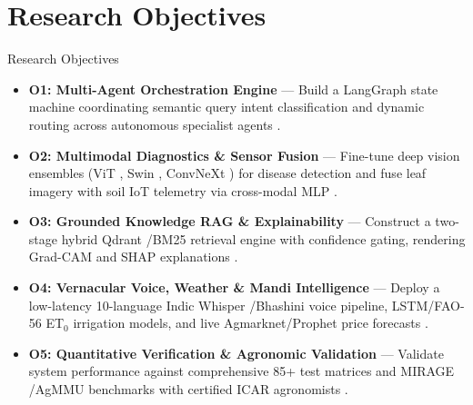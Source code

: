 \documentclass[aspectratio=169, 10pt]{beamer}
\begin{document}
\section{Research Objectives}
\begin{frame}{Research Objectives}
    \begin{itemize}\small\setlength{\itemsep}{1pt}
        \item \textbf{O1: Multi-Agent Orchestration Engine} --- Build a LangGraph state machine coordinating semantic query intent classification and dynamic routing across autonomous specialist agents \cite{langgraph2026,agroaskai2024}.
        \item \textbf{O2: Multimodal Diagnostics \& Sensor Fusion} --- Fine-tune deep vision ensembles (ViT \cite{vit2021}, Swin \cite{swinTransformer2021}, ConvNeXt \cite{convnext2022}) for disease detection and fuse leaf imagery with soil IoT telemetry via cross-modal MLP \cite{llmiCdp2025,cropibot2026}.
        \item \textbf{O3: Grounded Knowledge RAG \& Explainability} --- Construct a two-stage hybrid Qdrant \cite{qdrant2023}/BM25 \cite{robertson2009probabilistic} retrieval engine with confidence gating, rendering Grad-CAM \cite{gradcam2017} and SHAP \cite{shap2017} explanations \cite{ragMaize2026,xaiCrop2024}.
        \item \textbf{O4: Vernacular Voice, Weather \& Mandi Intelligence} --- Deploy a low-latency 10-language Indic Whisper \cite{whisper2022}/Bhashini \cite{bhashini2023} voice pipeline, LSTM/FAO-56 ET$_0$ \cite{fao56penman1998} irrigation models, and live Agmarknet/Prophet \cite{prophet2018} price forecasts \cite{enam2023,indicAsr2025}.
        \item \textbf{O5: Quantitative Verification \& Agronomic Validation} --- Validate system performance against comprehensive 85+ test matrices and MIRAGE \cite{mirage2025}/AgMMU \cite{agmmu2025} benchmarks with certified ICAR agronomists \cite{ragas2023}.
    \end{itemize}
\end{frame}

\end{document}
